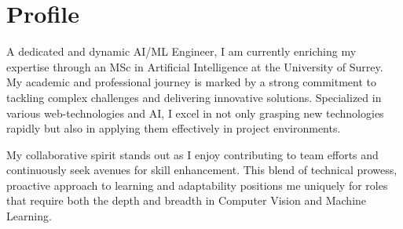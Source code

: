 \makecvtitle

\section{Profile}


A dedicated and dynamic AI/ML Engineer, I am currently enriching my expertise through an MSc in Artificial Intelligence
at the University of Surrey. My academic and professional journey is marked by a strong commitment to tackling complex
challenges and delivering innovative solutions. Specialized in various web-technologies and AI, I excel in not only
grasping new technologies rapidly but also in applying them effectively in project environments.

My collaborative spirit stands out as I enjoy contributing to team efforts and continuously seek avenues for skill
enhancement. This blend of technical prowess, proactive approach to learning and adaptability positions me
uniquely for roles that require both the depth and breadth in Computer Vision and Machine Learning.

